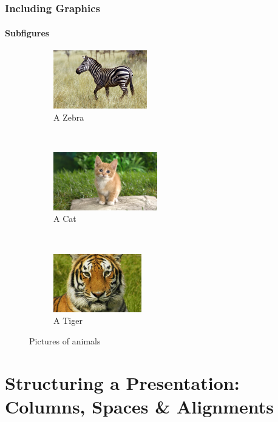 \documentclass[[newPxFont]{beamer}
\begin{document}
\subsection{}
\begin{frame}
  \frametitle{Including Graphics}
  \framesubtitle{Subfigures}
\begin{figure}
    \centering
    \begin{subfigure}[b]{0.3\textwidth}
        \includegraphics[width=\textwidth,height=1in]{figs/animal1}
        \caption{A Zebra}
        \label{fig:Zebra}
    \end{subfigure}
    ~ %
    \begin{subfigure}[b]{0.3\textwidth}
        \includegraphics[width=\textwidth,height=1in]{figs/animal2}
        \caption{A Cat}
        \label{fig:cat}
    \end{subfigure}
    ~ %
    \begin{subfigure}[b]{0.3\textwidth}
        \includegraphics[width=\textwidth,height=1in]{figs/animal3}
        \caption{A Tiger}
        \label{fig:tiger}
    \end{subfigure}
    \caption{Pictures of animals}\label{fig:animals}
\end{figure}
\end{frame}
\section[Structure]{Structuring a Presentation: Columns, Spaces \& Alignments}
\end{document}
